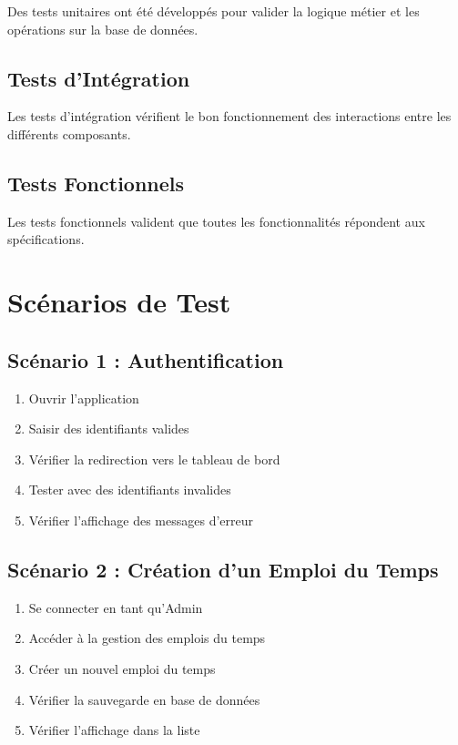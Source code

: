 \documentclass[12pt,a4paper]{report}
\begin{document}
Des tests unitaires ont été développés pour valider la logique métier et les opérations sur la base de données.

\subsection{Tests d'Intégration}

Les tests d'intégration vérifient le bon fonctionnement des interactions entre les différents composants.

\subsection{Tests Fonctionnels}

Les tests fonctionnels valident que toutes les fonctionnalités répondent aux spécifications.

\section{Scénarios de Test}

\subsection{Scénario 1 : Authentification}

\begin{enumerate}
    \item Ouvrir l'application
    \item Saisir des identifiants valides
    \item Vérifier la redirection vers le tableau de bord
    \item Tester avec des identifiants invalides
    \item Vérifier l'affichage des messages d'erreur
\end{enumerate}

\subsection{Scénario 2 : Création d'un Emploi du Temps}

\begin{enumerate}
    \item Se connecter en tant qu'Admin
    \item Accéder à la gestion des emplois du temps
    \item Créer un nouvel emploi du temps
    \item Vérifier la sauvegarde en base de données
    \item Vérifier l'affichage dans la liste
\end{enumerate}
\end{document}
